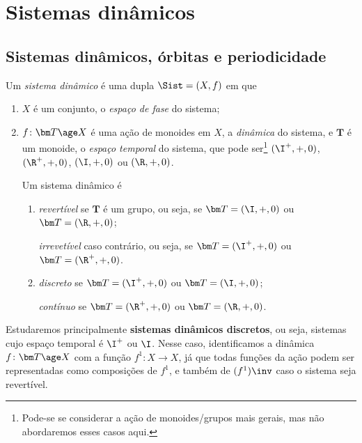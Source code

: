 \chapter{Sistemas dinâmicos}

\section{Sistemas dinâmicos, órbitas e periodicidade}

\begin{definition}
Um \emph{sistema dinâmico} é uma dupla $\Sist=(X,f)$ em que
\begin{enumerate}
\item $X$ é um conjunto, o \emph{espaço de fase} do sistema;
\item $f\colon \bm T \age X$ é uma ação de monoides em $X$, a \emph{dinâmica} do sistema, e $\bm T$ é um monoide, o \emph{espaço temporal} do sistema, que pode ser\footnote{Pode-se se considerar a ação de monoides/grupos mais gerais, mas não abordaremos esses casos aqui.} $(\I^+,+,0)$, $(\R^+,+,0)$, $(\I,+,0)$ ou $(\R,+,0)$.

Um sistema dinâmico é
	\begin{enumerate}
	\item \emph{revertível} se $\bm T$ é um grupo, ou seja, se $\bm T = (\I,+,0)$ ou $\bm T = (\R,+,0)$;

	\emph{irrevetível} caso contrário, ou seja, se $\bm T = (\I^+,+,0)$ ou $\bm T = (\R^+,+,0)$.

	\item  \emph{discreto} se $\bm T = (\I^+,+,0)$ ou $\bm T = (\I,+,0)$;

	\emph{contínuo} se $\bm T = (\R^+,+,0)$ ou $\bm T = (\R,+,0)$.
	\end{enumerate}
\end{enumerate}
\end{definition}

Estudaremos principalmente \textbf{sistemas dinâmicos discretos}, ou seja, sistemas cujo espaço temporal é $\I^+$ ou $\I$. Nesse caso, identificamos a dinâmica $f\colon \bm T \age X$ com a função $f^1\colon X \to X$, já que todas funções da ação podem ser representadas como composições de $f^1$, e também de $(f^1)\inv$ caso o sistema seja revertível.

